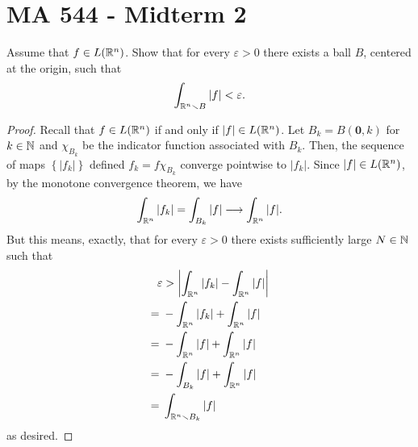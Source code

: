 \section{MA 544 - Midterm 2}
\begin{problem}
Assume that $f\in L(\mathbb{R}^n)$. Show that for every $\varepsilon>0$ there
exists a ball $B$, centered at the origin, such that
\[
\int_{\mathbb{R}^n\smallsetminus B}|f|<\varepsilon.
\]
\end{problem}
\begin{proof}
Recall that $f\in L(\mathbb{R}^n)$ if and only if $|f|\in
L(\mathbb{R}^n)$. Let $B_k= B(\mathbf{0},k)$ for $k\in\mathbb{N}$ and
$\chi_{B_k}$ be the indicator function associated with $B_k$. Then, the
sequence of maps $\left\{|f_k|\right\}$ defined $f_k= f\chi_{B_k}$
converge pointwise to $|f_k|$. Since $|f|\in L(\mathbb{R}^n)$, by the monotone
convergence theorem, we have
\begin{equation}
\label{eq:monotonicity-2-1}
\int_{\mathbb{R}^n} |f_k|=\int_{B_k}|f|\longrightarrow\int_{\mathbb{R}^n}|f|.
\end{equation}
But this means, exactly, that for every $\varepsilon>0$ there exists
sufficiently large $N\in\mathbb{N}$ such that
\begin{equation}
\label{eq:desired-inequality-2-1}
\begin{aligned}
\varepsilon&>\left|\int_{\mathbb{R}^n}|f_k|-\int_{\mathbb{R}^n}|f|\right|\\
={}&-\int_{\mathbb{R}^n}|f_k|+\int_{\mathbb{R}^n}|f|\\
={}&-\int_{\mathbb{R}^n}|f|+\int_{\mathbb{R}^n}|f|\\
={}&-\int_{B_k}|f|+\int_{\mathbb{R}^n}|f|\\
={}&\int_{\mathbb{R}^n\smallsetminus B_k}|f|
\end{aligned}
\end{equation}
as desired.
\end{proof}

